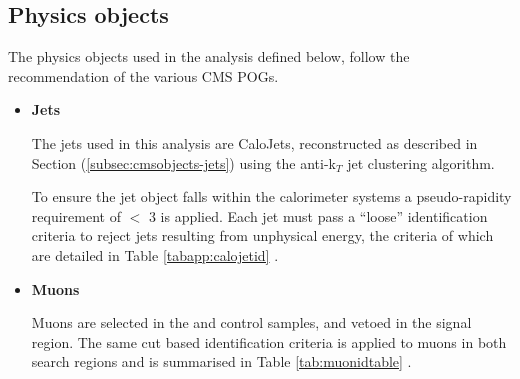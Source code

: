 \subsection{Physics objects}
\label{subsec:physicsobjects}

The physics objects used in the analysis defined below, follow the recommendation of the various \ac{CMS} \acf{POGs}. 

\begin{itemize}

\item \textbf{Jets}

The jets used in this analysis are CaloJets, reconstructed as described in Section (\ref{subsec:cmsobjects-jets}) using the anti-k$_{T}$ jet clustering algorithm. 

To ensure the jet object falls within the calorimeter systems a pseudo-rapidity requirement of \abeta $<$ 3 is applied. Each jet must pass a ``loose'' identification criteria to reject jets resulting from unphysical energy, the criteria of which are detailed in Table \ref{tabapp:calojetid} \cite{CMS-PAS-JME-09-008}.

\item \textbf{Muons}

Muons are selected in the \mupjets and \dimupjets control samples, and vetoed in the signal region. The same cut based identification criteria is applied to muons in both search regions and is summarised in Table \ref{tab:muonidtable} \cite{1748-0221-7-10-P10002}.


\end{itemize}
